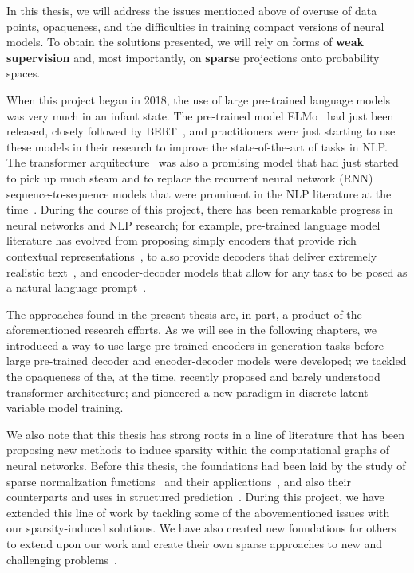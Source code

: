 In this thesis, we will address the issues mentioned above of overuse
of data points, opaqueness, and the difficulties in training compact
versions of neural models. To obtain the solutions presented, we will
rely on forms of \textbf{weak supervision} and, most importantly, on
\textbf{sparse} projections onto probability spaces.

When this project began in 2018, the use of large pre-trained
language models was very much in an infant state. The
pre-trained model ELMo~\citep{peters2018deep} had just been released,
closely followed by BERT~\citep{devlin2018bert}, and practitioners
were just starting to use these models in their research to improve
the state-of-the-art of tasks in NLP. The transformer
arquitecture~\citep{vaswani2017attention} was also a promising model
that had just started to pick up much steam and to replace the
recurrent neural network (RNN) sequence-to-sequence models that were
prominent in the NLP literature at the
time~\citep{bahdanau2014neural}. During the course of this project,
there has been remarkable progress in neural networks and NLP
research; for example, pre-trained language model literature has
evolved from proposing simply encoders that provide rich contextual
representations~\citep[\eg, ELMo and BERT;][]{peters2018deep,
    devlin2018bert}, to also provide decoders that deliver extremely
realistic text~\citep[\eg, GPT-3;][]{brown2020language}, and
encoder-decoder models that allow for any task to be posed as a
natural language prompt~\citep[\eg, T5 and
    BART;][]{raffel2020Exploringlimitstransfer,lewis2020BARTDenoisingSequencetoSequence}.

The approaches found in the present thesis are, in part, a product of
the aforementioned research efforts. As we will see in the following
chapters, we introduced a way to use large pre-trained encoders in
generation tasks before large pre-trained decoder and encoder-decoder
models were developed; we tackled the opaqueness of the, at the time,
recently proposed and barely understood transformer architecture; and
pioneered a new paradigm in discrete latent variable model training.

We also note that this thesis has strong roots in a line of
literature that has been proposing new methods to induce sparsity
within the computational graphs of neural networks. Before this
thesis, the foundations had been laid by the study of sparse
normalization functions~\citep{sparsemax,fusedmax,entmax} and their
applications~\citep{maruf2019selective,malaviya2018sparse}, and also
their counterparts and uses in structured prediction~\citep{sparsemap,sparsemapcg}.
During this project, we have extended this line of work by tackling
some of the abovementioned issues with our sparsity-induced
solutions. We have also created new foundations for others to extend
upon our work and create their own sparse approaches to new and
challenging problems~\citep{treviso2021PredictingAttentionSparsity,
    farinhas2022SparseCommunicationMixed}.





\cleardoublepage
\singlespacing
